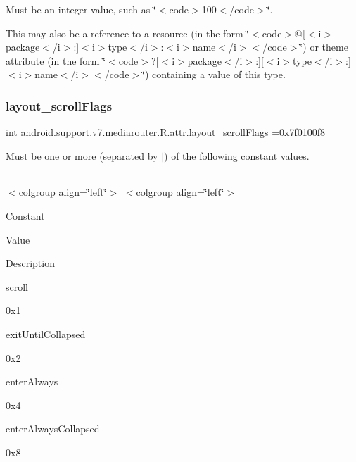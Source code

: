 Must be an integer value, such as \char`\"{}$<$code$>$100$<$/code$>$\char`\"{}. 

This may also be a reference to a resource (in the form \char`\"{}$<$code$>$@\mbox{[}$<$i$>$package$<$/i$>$\+:\mbox{]}$<$i$>$type$<$/i$>$\+:$<$i$>$name$<$/i$>$$<$/code$>$\char`\"{}) or theme attribute (in the form \char`\"{}$<$code$>$?\mbox{[}$<$i$>$package$<$/i$>$\+:\mbox{]}\mbox{[}$<$i$>$type$<$/i$>$\+:\mbox{]}$<$i$>$name$<$/i$>$$<$/code$>$\char`\"{}) containing a value of this type. \mbox{\label{classandroid_1_1support_1_1v7_1_1mediarouter_1_1R_1_1attr_a7ffb7431db8067b52ba477cf40366447}} 
\subsubsection{\texorpdfstring{layout\+\_\+scroll\+Flags}{layout\_scrollFlags}}
{\footnotesize\ttfamily int android.\+support.\+v7.\+mediarouter.\+R.\+attr.\+layout\+\_\+scroll\+Flags =0x7f0100f8\hspace{0.3cm}{\ttfamily [static]}}

Must be one or more (separated by \textquotesingle{}$\vert$\textquotesingle{}) of the following constant values.

\tabulinesep=1mm
\begin{longtabu} spread 0pt [c]{*{0}{|X[-1]}|}
\hline
\end{longtabu}
$<$colgroup align=\char`\"{}left\char`\"{}$>$ $<$colgroup align=\char`\"{}left\char`\"{}$>$ 

Constant

Value

Description 

{\ttfamily scroll}

0x1

{\ttfamily exit\+Until\+Collapsed}

0x2

{\ttfamily enter\+Always}

0x4

{\ttfamily enter\+Always\+Collapsed}

0x8

